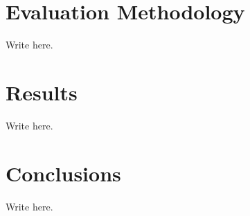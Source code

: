 \documentclass[10pt]{article}
\begin{document}
\section{Evaluation Methodology}

Write here. 




\section{Results}

Write here. 





\section{Conclusions}

Write here. 




\end{document}
